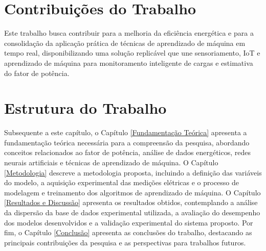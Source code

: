 \section{Contribuições do Trabalho}
Este trabalho busca contribuir para a melhoria da eficiência energética e para a consolidação da aplicação prática de técnicas de aprendizado de máquina em tempo real, disponibilizando uma solução replicável que une sensoriamento, IoT e aprendizado de máquina para monitoramento inteligente de cargas e estimativa do fator de potência.

\section{Estrutura do Trabalho}
Subsequente a este capítulo, o Capítulo \ref{Fundamentação Teórica} apresenta a fundamentação teórica necessária para a compreensão da pesquisa, abordando conceitos relacionados ao fator de potência, análise de dados energéticos, redes neurais artificiais e técnicas de aprendizado de máquina. O Capítulo \ref{Metodologia} descreve a metodologia proposta, incluindo a definição das variáveis do modelo, a aquisição experimental das medições elétricas e o processo de modelagem e treinamento dos algoritmos de aprendizado de máquina. O Capítulo \ref{Resultados e Discussão} apresenta os resultados obtidos, contemplando a análise da dispersão da base de dados experimental utilizada, a avaliação do desempenho dos modelos desenvolvidos e a validação experimental do sistema proposto. Por fim, o Capítulo \ref{Conclusão} apresenta as conclusões do trabalho, destacando as principais contribuições da pesquisa e as perspectivas para trabalhos futuros.

